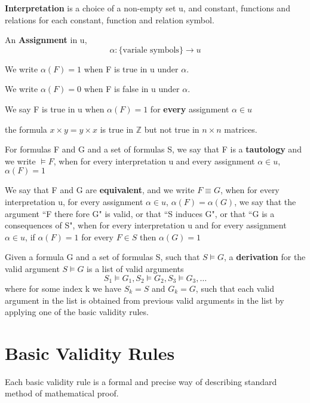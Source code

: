 
\begin{defn}
\textbf{Interpretation} is a choice of a non-empty set u, and constant, functions and relations for each constant, function and relation symbol.

An \textbf{Assignment} in u, $$\alpha \colon \{\text{variale symbols}\}\to u$$

We write $\alpha (F) = 1$ when F is true in u under $\alpha$.

We write $\alpha (F) = 0$ when F is false in u under $\alpha$.

We say F is true in u when $\alpha (F) = 1$ for \textbf{every} assignment $\alpha \in u$
\end{defn}

\begin{exmp}
the formula $x\times y = y \times x$ is true in $\mathbb{Z}$ but not true in $n\times n$ matrices.
\end{exmp}

\begin{defn}
For formulas F and G and a set of formulas S, we say that F is a \textbf{tautology} and we write $\vDash F$, when for every interpretation u and every assignment $\alpha \in u$, $\alpha (F) = 1$
\end{defn}

\begin{defn}
We say that F and G are \textbf{equivalent}, and we write $F\equiv G$, when for every interpretation u, for every assignment $\alpha \in u$, $\alpha (F) = \alpha (G)$, we say that the argument ``F there fore G" is valid, or that ``S induces G", or that ``G is a consequences of S", when for every interpretation u and for every assignment $\alpha \in u$, if $\alpha (F) = 1$ for every $F\in S$ then $\alpha (G) = 1$
\end{defn}

\begin{defn}
Given a formula G and a set of formulas S, such that $S\vDash G$, a \textbf{derivation} for the valid argument $S\vDash G$ is a list of valid arguments
$$S_1\vDash G_1,S_2\vDash G_2,S_3\vDash G_3,\dots$$
where for some index k we have $S_k=S$ and $G_k = G$, such that each valid argument in the list is obtained from previous valid arguments in the list by applying one of the basic validity rules.
\end{defn}

\section{Basic Validity Rules}
Each basic validity rule is a formal and precise way of describing standard method of mathematical proof.

